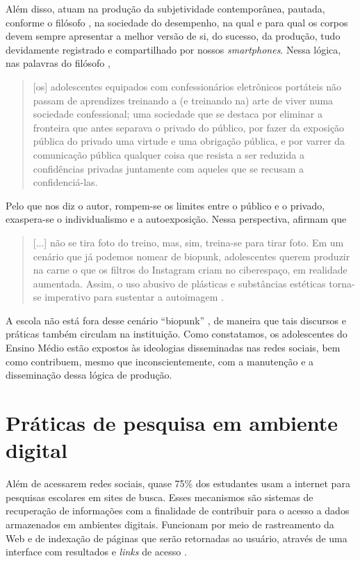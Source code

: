 \documentclass[portuguese]{textolivre}
\begin{document}
Além disso, atuam na produção da subjetividade contemporânea, pautada, conforme o filósofo \textcite{han_sociedade_2015}, na sociedade do desempenho, na qual e para qual os corpos devem sempre apresentar a melhor versão de si, do sucesso, da produção, tudo devidamente registrado e compartilhado por nossos \textit{smartphones}. Nessa lógica, nas  palavras do filósofo \textcite[p.~21]{bauman_vigilancia_2013},

\begin{quote}
    [os] adolescentes equipados com confessionários eletrônicos portáteis não passam de aprendizes treinando a (e treinando na) arte de viver numa sociedade confessional; uma sociedade que se destaca por eliminar a fronteira que antes separava o privado do público, por fazer da exposição pública do privado uma virtude e uma obrigação pública, e por varrer da comunicação pública qualquer coisa que resista a ser reduzida a confidências privadas juntamente com aqueles que se recusam a confidenciá-las.
\end{quote}

Pelo que nos diz o autor, rompem-se os limites entre o público e o privado, exaspera-se o individualismo e a autoexposição. Nessa perspectiva, \textcite{faustino_colonialismo_2023} afirmam que

\begin{quote}
    [...] não se tira foto do treino, mas, sim, treina-se para tirar foto. Em um cenário que já podemos nomear de biopunk, adolescentes querem produzir na carne o que os filtros do Instagram criam no ciberespaço, em realidade aumentada. Assim, o uso abusivo de plásticas e substâncias estéticas torna-se imperativo para sustentar a autoimagem \cite[p.~159-160]{faustino_colonialismo_2023}.
\end{quote}

A escola não está fora desse cenário ``biopunk'' \cite{faustino_colonialismo_2023}, de maneira que tais discursos e práticas também circulam na instituição. Como constatamos, os adolescentes do Ensino Médio estão expostos às ideologias disseminadas nas redes sociais, bem como contribuem, mesmo que inconscientemente, com a manutenção e a disseminação dessa lógica de produção.

\section{Práticas de pesquisa em ambiente digital}\label{sec-modelo}
Além de acessarem redes sociais, quase 75\% dos estudantes usam a internet para pesquisas escolares em sites de busca. Esses mecanismos são sistemas de recuperação de informações com a finalidade de contribuir para o acesso a dados armazenados em ambientes digitais. Funcionam por meio de rastreamento da Web e de indexação de páginas que serão retornadas ao usuário, através de uma interface com resultados e \textit{links} de acesso \cite{caldeira_o_2015}.
\end{document}
